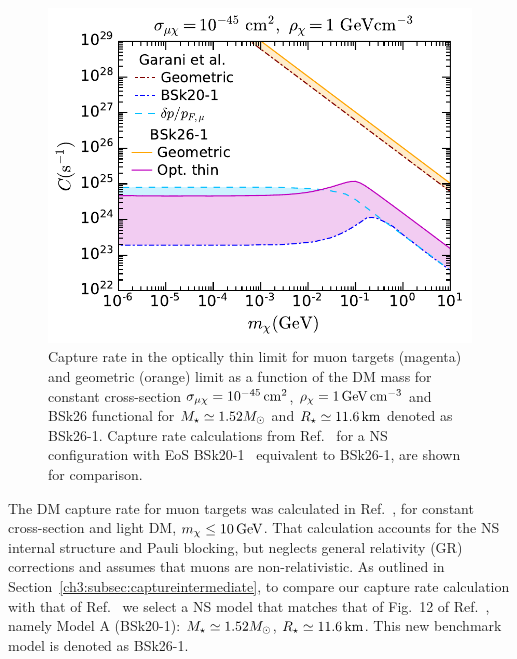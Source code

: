 \begin{figure}
    \centering
    \includegraphics[width=.7\textwidth]{capture_2/capture_rate_n0_comp_muons.pdf}
    \caption{ Capture rate in the optically thin limit for muon targets  (magenta) and geometric (orange) limit as a function of the DM mass for constant cross-section $\sigma_{\mu\chi}=10^{-45}{\rm \,cm}^2$,  $\rho_\chi=1{\rm \,GeV}{\rm \,cm}^{-3}$ and BSk26 functional for $M_\star\simeq1.52M_\odot$ and $R_\star\simeq11.6{\rm \,km}$ denoted as BSk26-1. Capture rate calculations from Ref.~\cite{Garani:2018kkd_may_NewAnalysisNeutron} for a NS configuration with EoS BSk20-1~\cite{Potekhin:2013qqa_Analyticalrepresentationsunified} equivalent to BSk26-1, are shown for comparison. 
    }
    \label{ch4:fig:Cratecomp}
\end{figure}
  

The DM capture rate for muon targets was calculated in Ref.~\cite{Garani:2018kkd_may_NewAnalysisNeutron}, for constant cross-section and light DM, $m_\chi\leq10{\rm \,GeV}$. That calculation accounts for the NS internal structure and Pauli blocking, but neglects general relativity (GR) corrections and assumes that muons are non-relativistic. 
As outlined in Section~\ref{ch3:subsec:captureintermediate}, to compare our capture rate calculation with that of Ref.~\cite{Garani:2018kkd_may_NewAnalysisNeutron}  we select a NS model that matches that of Fig.~12 of Ref.~\cite{Garani:2018kkd_may_NewAnalysisNeutron}, namely Model A (BSk20-1):  $M_\star\simeq1.52M_\odot$, $R_\star\simeq11.6{\rm \,km}$. This new benchmark model is denoted as BSk26-1.  

